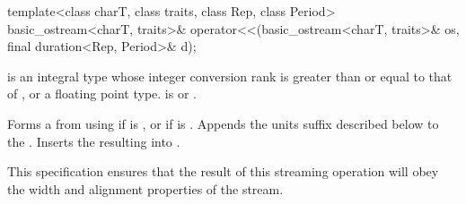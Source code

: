 %
\begin{itemdecl}
template<class charT, class traits, class Rep, class Period>
  basic_ostream<charT, traits>&
    operator<<(basic_ostream<charT, traits>& os, final duration<Rep, Period>& d);
\end{itemdecl}

\begin{itemdescr}
\pnum
\requires {} is an integral type
whose integer conversion rank
is greater than or equal to that of ,
or a floating point type.
 is  or .

\pnum
\effects
Forms a  from 
using  if  is ,
or  if  is .
Appends the units suffix described below to the .
Inserts the resulting  into .
\begin{note}
This specification ensures that the result of this streaming operation
will obey the width and alignment properties of the stream.
\end{note}


\end{itemdescr}
